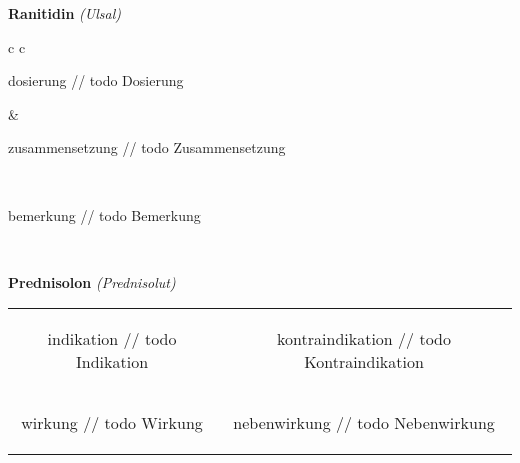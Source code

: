 \documentclass[12pt]{beamer}
\begin{document}
\begin{frame}{
    \textbf{Ranitidin}
    \textit{(Ulsal)}
}
    \begin{tabular}{c c}
        \begin{beamercolorbox}[wd=\boxwidth\textwidth,ht=\boxheight\textheight,sep=1em]{dosierung}
        // todo Dosierung
        \end{beamercolorbox} & 
        \begin{beamercolorbox}[wd=\boxwidth\textwidth,ht=\boxheight\textheight,sep=1em]{zusammensetzung}
        // todo Zusammensetzung
        \end{beamercolorbox} \\
        \begin{beamercolorbox}[wd=\textwidth,ht=\boxheight\textheight,sep=1em]{bemerkung}
        // todo Bemerkung
        \end{beamercolorbox} \\
    \end{tabular}
\end{frame}
\begin{frame}{
    \textbf{Prednisolon}
    \textit{(Prednisolut)}
}
    \begin{tabular}{c c}
        \begin{beamercolorbox}[wd=\boxwidth\textwidth,ht=\boxheight\textheight,sep=1em]{indikation}
        // todo Indikation
        \end{beamercolorbox} & 
        \begin{beamercolorbox}[wd=\boxwidth\textwidth,ht=\boxheight\textheight,sep=1em]{kontraindikation}
        // todo Kontraindikation 
        \end{beamercolorbox} \\
        \begin{beamercolorbox}[wd=\boxwidth\textwidth,ht=\boxheight\textheight,sep=1em]{wirkung}
        // todo Wirkung
        \end{beamercolorbox} & 
        \begin{beamercolorbox}[wd=\boxwidth\textwidth,ht=\boxheight\textheight,sep=1em]{nebenwirkung}
        // todo Nebenwirkung
        \end{beamercolorbox} \\
    \end{tabular}
\end{frame}
\end{document}

